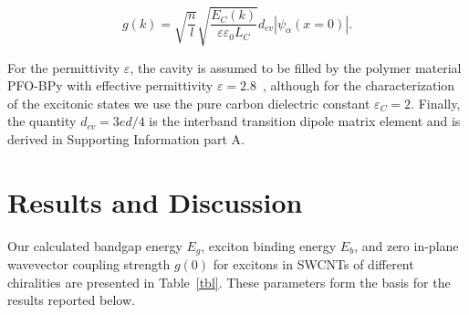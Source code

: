 \documentclass[journal=aamick,manuscript=article]{achemso}
\begin{document}
%
\begin{equation}
	\label{Rabi-2}
  	g(k)=\sqrt{\frac{n}{l}}\sqrt{\frac{E_C (k)}{\varepsilon \varepsilon_0 L_C}}  d_{cv} \left|\psi_{\alpha}(x=0)\right|.
\end{equation}
%

For the permittivity $\varepsilon$, the cavity is assumed to be filled by the polymer material PFO-BPy with effective permittivity $\varepsilon=2.8$~\cite{Graf2016}, although for the characterization of the excitonic states we use the pure carbon dielectric constant $\varepsilon_{C}=2$.
Finally, the quantity $d_{cv}= 3ed/4$ is the interband transition dipole matrix element and is derived in Supporting Information part A.\\

\section*{Results and Discussion}
Our calculated bandgap energy $E_g$, exciton binding energy $E_b$, and zero in-plane wavevector coupling strength $g(0)$ for excitons in SWCNTs of different chiralities are presented in Table~\ref{tbl}. These parameters form the basis for the results reported below.
\end{document}

